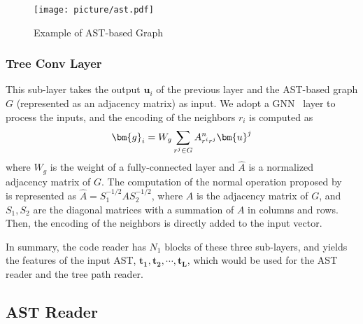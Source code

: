  \begin{figure}
    \centering
    \texttt{[image: picture/ast.pdf]}
                            \vspace{-5mm}
    \caption{Example of AST-based Graph}
    \vspace{-2mm}
    \label{fig:ast}
\end{figure}

\subsubsection{{Tree Conv Layer}}
This sub-layer takes the output $\bm{u}_i$ of the previous layer and the AST-based graph $G$ (represented as an adjacency matrix) as input.
We adopt a GNN~\cite{gnn08, Zhang_2020} layer to process the inputs, and the encoding of the neighbors $r_i$ is computed as 
\begin{equation}
    \bm{g}_i = W_g \sum_{r^j \in G}A^{n}_{r^i r^j}\bm{u}^j
    \vspace{-1mm}
\end{equation}
where $W_g$ is the weight of a fully-connected layer and $\hat{A}$ is a normalized adjacency matrix of $G$. The computation of the normal operation proposed by \citeauthor{kipf2016semi}~\cite{kipf2016semi} is represented as $\hat{A} = S_1^{-1/2} A S_2^{-1/2}$,
where $A$ is the adjacency matrix of $G$, and $S_1, S_2$ are the diagonal matrices with a summation of $A$ in columns and rows. Then, the encoding of the neighbors is directly added to the input vector.

In summary, the code reader has $N_1$ blocks of these three sub-layers, and yields the features of the input AST, $\bm{t_1}, \bm{t_2},\cdots,\bm{t_L}$, which would be used for the AST reader and the tree path reader.
\subsection{AST Reader}
